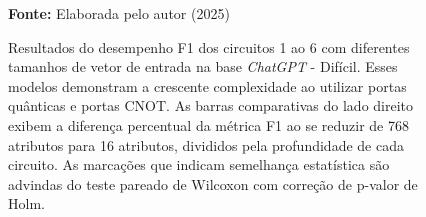 \begin{figure}
\caption{Resultados do desempenho F1 dos circuitos 1 ao 6 com diferentes tamanhos de vetor de entrada na base \textit{ChatGPT} - Difícil. Esses modelos demonstram a crescente complexidade ao utilizar portas quânticas e portas CNOT. As barras comparativas do lado direito exibem a diferença percentual da métrica F1 ao se reduzir de 768 atributos para 16 atributos, divididos pela profundidade de cada circuito. As marcações que indicam semelhança estatística são advindas do teste pareado de Wilcoxon com correção de p-valor de Holm.}
\label{fig:n_features:hard:g1}
     \centering
    \centering
      \par\medskip\ABNTEXfontereduzida\selectfont\textbf{Fonte:} Elaborada pelo autor (2025) \par\medskip
\end{figure}